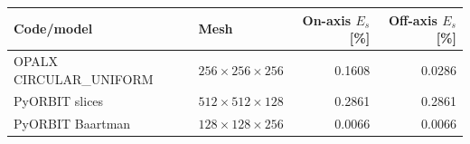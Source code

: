 \begin{tabular}{llrr}
\toprule
Code/model & Mesh & On-axis $E_s$ [\%] & Off-axis $E_s$ [\%] \\
\midrule
OPALX CIRCULAR\_UNIFORM & $256\times256\times256$ & 0.1608 & 0.0286 \\
PyORBIT slices & $512\times512\times128$ & 0.2861 & 0.2861 \\
PyORBIT Baartman & $128\times128\times256$ & 0.0066 & 0.0066 \\
\bottomrule
\end{tabular}
